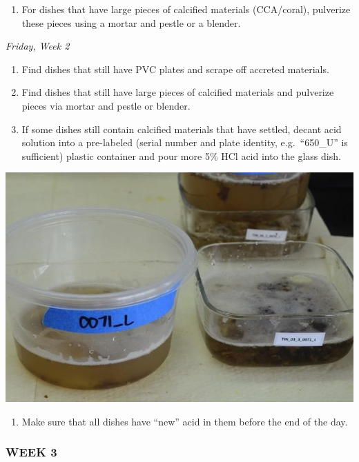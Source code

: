 \documentclass[]{book}
\providecommand{\tightlist}{%
  \setlength{\itemsep}{0pt}\setlength{\parskip}{0pt}}
\begin{document}
\begin{enumerate}
\def\labelenumi{\arabic{enumi}.}
\setcounter{enumi}{4}
\tightlist
\item
  For dishes that have large pieces of calcified materials (CCA/coral), pulverize these pieces using a mortar and pestle or a blender.
\end{enumerate}

\emph{Friday, Week 2}

\begin{enumerate}
\def\labelenumi{\arabic{enumi}.}
\tightlist
\item
  Find dishes that still have PVC plates and scrape off accreted materials.
\item
  Find dishes that still have large pieces of calcified materials and pulverize pieces via mortar and pestle or blender.
\item
  If some dishes still contain calcified materials that have settled, decant acid solution into a pre-labeled (serial number and plate identity, e.g.~``650\_U'' is sufficient) plastic container and pour more 5\% HCl acid into the glass dish.
\end{enumerate}

\includegraphics{images/DailyTasks11.jpg}

\begin{enumerate}
\def\labelenumi{\arabic{enumi}.}
\setcounter{enumi}{3}
\tightlist
\item
  Make sure that all dishes have ``new'' acid in them before the end of the day.
\end{enumerate}

\hypertarget{week-3}{%
\subsubsection{WEEK 3}\label{week-3}}
\end{document}
